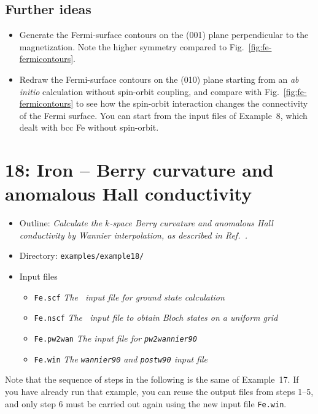 \documentclass[a4paper,11pt,twoside]{article}
\begin{document}
\subsection*{Further ideas}

\begin{itemize}

\item Generate the Fermi-surface contours on the (001) plane
perpendicular to the magnetization. Note the higher symmetry compared
to Fig.~\ref{fig:fe-fermicontours}.

\item Redraw the Fermi-surface contours on the (010) plane starting
  from an {\it ab initio} calculation without spin-orbit coupling, and
  compare with Fig.~\ref{fig:fe-fermicontours} to see how the
  spin-orbit interaction changes the connectivity of the Fermi
  surface.  You can start from the input files of Example~8, which
  dealt with bcc Fe without spin-orbit.

\end{itemize}

\cleardoublepage

\section*{18: Iron -- Berry curvature and anomalous Hall 
conductivity}

\begin{itemize}
\item{Outline: \it{Calculate the $k$-space Berry curvature and
      anomalous Hall conductivity by Wannier interpolation, as
      described in Ref.~\cite{wang-prb06}.}}
\item{Directory: {\tt examples/example18/}}
\item{Input files}
\begin{itemize}
\item{ {\tt Fe.scf} {\it The \pwscf\ input file for ground state
    calculation}}
\item{ {\tt Fe.nscf}  {\it The \pwscf\ input file to obtain Bloch
    states on a uniform grid}} 
\item{ {\tt Fe.pw2wan}  {\it The input file for {\tt pw2wannier90}}}
\item{ {\tt Fe.win}  {\it The {\tt wannier90} and {\tt postw90} input file}}
\end{itemize}
\end{itemize}

Note that the sequence of steps in the following is the same of
Example~17.  If you have already run that example, you can reuse the
output files from steps 1--5, and only step 6 must be carried out
again using the new input file {\tt Fe.win}.
\end{document}
